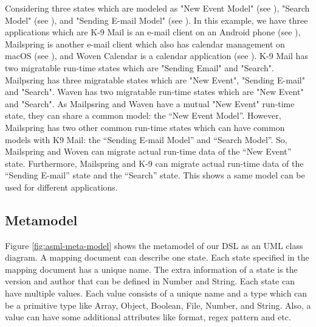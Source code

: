 Considering three states which are modeled as "New Event Model" (see \fcircfour), "Search Model" (see \fcircfive), and "Sending E-mail Model" (see \fcircsix). In this example, we have three applications which are K-9 Mail is an e-mail client on an Android phone (see \fcircseven), Mailspring is another e-mail client which also has calendar management on macOS (see \fcirceight), and Woven Calendar is a calendar application (see \fcircnine). K-9 Mail has two migratable run-time states which are "Sending Email" and "Search". Mailpsring has three migratable states which are "New Event", "Sending E-mail" and "Search". Waven has two migratable run-time states which are "New Event" and "Search". As Mailpsring and Waven have a mutual "New Event" run-time state, they can share a common model: the “New Event Model”. However, Mailspring has two other common run-time states which can have common models with K9 Mail: the “Sending E-mail Model” and “Search Model”. So, Mailspring and Woven can migrate actual run-time data of the “New Event” state. Furthermore, Mailspring and K-9 can migrate actual run-time data of the “Sending E-mail” state and the “Search” state. This shows a same model can be used for different applications.

\subsection{Metamodel}
Figure \ref{fig:asml-meta-model} shows the metamodel of our DSL as an UML class diagram. A mapping document can describe one state. Each state specified in the mapping document has a unique name. The extra information of a state is the version and author that can be defined in Number and String. Each state can have multiple values. Each value consists of a unique name and a type which can be a primitive type like Array, Object, Boolean, File, Number, and String. Also, a value can have some additional attributes like format, regex pattern and etc.

